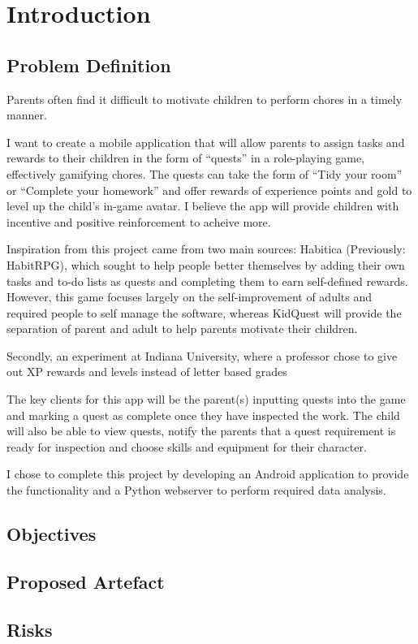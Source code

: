 
\chapter{Introduction}
\label{chap:intro}

\section{Problem Definition}
Parents often find it difficult to motivate children to perform chores in a timely manner.

I want to create a mobile application that will allow parents to assign tasks and rewards to their children in the form of ``quests'' in a role-playing game, effectively gamifying chores. 
The quests can take the form of “Tidy your room” or “Complete your homework” and offer rewards of experience points and gold to level up the child's in-game avatar. 
I believe the app will provide children with incentive and positive reinforcement to acheive more.

Inspiration from this project came from two main sources: Habitica (Previously: HabitRPG), which sought to help people better themselves by adding their own tasks and to-do lists as quests and completing them to earn self-defined rewards. 
However, this game focuses largely on the self-improvement of adults and required people to self manage the software, whereas KidQuest will provide the separation of parent and adult to help parents motivate their children.

Secondly, an experiment at Indiana University, where a professor chose to give out XP rewards and levels instead of letter based grades \cite{sheldon2011multiplayer} 

The key clients for this app will be the parent(s) inputting quests into the game and marking a quest as complete once they have inspected the work. 
The child will also be able to view quests, notify the parents that a quest requirement is ready for inspection and choose skills and equipment for their character. 

I chose to complete this project by developing an Android application to provide the functionality and a Python webserver to perform required data analysis.

\section{Objectives}

\section{Proposed Artefact}

\section{Risks}

